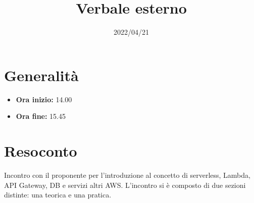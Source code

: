 \documentclass{classes/base}
\title{Verbale esterno}
\date{2022/04/21}
\author{\giulio}
\renewcommand{\maketitle}{
    
}
\begin{document}
    \maketitle

    \section*{Generalità}
    \begin{itemize}
        \item \textbf{Ora inizio:} 14.00
        \item \textbf{Ora fine:} 15.45
    \end{itemize}

    \section*{Resoconto}
    Incontro con il proponente per l'introduzione al concetto di serverless, Lambda, API Gateway, DB e servizi altri AWS.
    L'incontro si è composto di due sezioni distinte: una teorica e una pratica.
\end{document}
